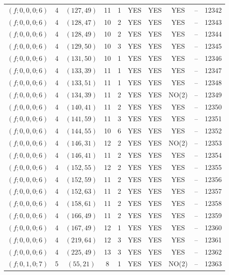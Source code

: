 \begin{longtable}{|c|c|c|c|c|c|c|c|c|c|}
$(f; 0, 0, 0; 6)$ & 4 & $(127, 49)$ & 11 & 1 & YES & YES & YES & -- & 12342\\
$(f; 0, 0, 0; 6)$ & 4 & $(128, 47)$ & 10 & 2 & YES & YES & YES & -- & 12343\\
$(f; 0, 0, 0; 6)$ & 4 & $(128, 49)$ & 10 & 2 & YES & YES & YES & -- & 12344\\
$(f; 0, 0, 0; 6)$ & 4 & $(129, 50)$ & 10 & 3 & YES & YES & YES & -- & 12345\\
$(f; 0, 0, 0; 6)$ & 4 & $(131, 50)$ & 10 & 1 & YES & YES & YES & -- & 12346\\
$(f; 0, 0, 0; 6)$ & 4 & $(133, 39)$ & 11 & 1 & YES & YES & YES & -- & 12347\\
$(f; 0, 0, 0; 6)$ & 4 & $(133, 51)$ & 11 & 1 & YES & YES & YES & -- & 12348\\
$(f; 0, 0, 0; 6)$ & 4 & $(134, 39)$ & 11 & 2 & YES & YES & NO(2) & -- & 12349\\
$(f; 0, 0, 0; 6)$ & 4 & $(140, 41)$ & 11 & 2 & YES & YES & YES & -- & 12350\\
$(f; 0, 0, 0; 6)$ & 4 & $(141, 59)$ & 11 & 3 & YES & YES & YES & -- & 12351\\
$(f; 0, 0, 0; 6)$ & 4 & $(144, 55)$ & 10 & 6 & YES & YES & YES & -- & 12352\\
$(f; 0, 0, 0; 6)$ & 4 & $(146, 31)$ & 12 & 2 & YES & YES & NO(2) & -- & 12353\\
$(f; 0, 0, 0; 6)$ & 4 & $(146, 41)$ & 11 & 2 & YES & YES & YES & -- & 12354\\
$(f; 0, 0, 0; 6)$ & 4 & $(152, 55)$ & 12 & 2 & YES & YES & YES & -- & 12355\\
$(f; 0, 0, 0; 6)$ & 4 & $(152, 59)$ & 11 & 2 & YES & YES & YES & -- & 12356\\
$(f; 0, 0, 0; 6)$ & 4 & $(152, 63)$ & 11 & 2 & YES & YES & YES & -- & 12357\\
$(f; 0, 0, 0; 6)$ & 4 & $(158, 61)$ & 11 & 2 & YES & YES & YES & -- & 12358\\
$(f; 0, 0, 0; 6)$ & 4 & $(166, 49)$ & 11 & 2 & YES & YES & YES & -- & 12359\\
$(f; 0, 0, 0; 6)$ & 4 & $(167, 49)$ & 12 & 1 & YES & YES & YES & -- & 12360\\
$(f; 0, 0, 0; 6)$ & 4 & $(219, 64)$ & 12 & 3 & YES & YES & YES & -- & 12361\\
$(f; 0, 0, 0; 6)$ & 4 & $(225, 49)$ & 13 & 3 & YES & YES & YES & -- & 12362\\
$(f; 0, 1, 0; 7)$ & 5 & $(55, 21)$ & 8 & 1 & YES & YES & NO(2) & -- & 12363\\

\end{longtable}
